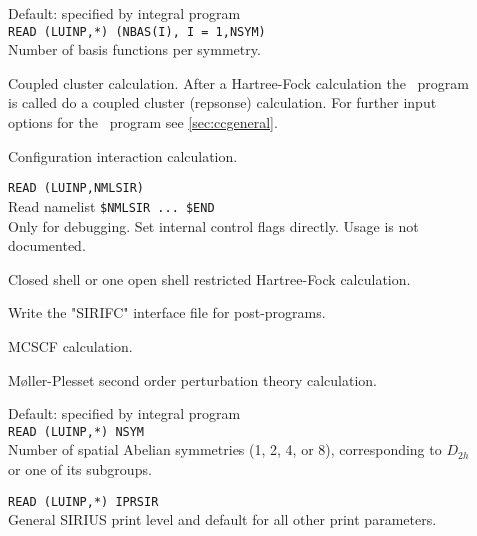 \begin{description}
\item[]
   Default: specified by integral program \\
   \verb"READ (LUINP,*) (NBAS(I), I = 1,NSYM)" \\
   Number of basis functions per symmetry.

\item[]
  Coupled cluster calculation. After a Hartree-Fock calculation
  the \cc\ program is called do a coupled cluster (repsonse) calculation.
  For further input options for the \cc\ program see \ref{sec:ccgeneral}.

\item[]
  Configuration interaction calculation.
 
\item[]
  \verb"READ (LUINP,NMLSIR)" \\
  Read namelist \verb"$NMLSIR ... $END" \\
  Only for debugging. Set internal control flags directly.
  Usage is not documented.

\item[]
  Closed shell or one open shell restricted
  Hartree-Fock calculation. 
 
\item[]
  Write the "SIRIFC" interface file for post-programs.
 
\item[]
  MCSCF calculation.
 
\item[]
  M{\o}ller-Plesset second order perturbation theory calculation. 
 
\item[]
  Default: specified by integral program \\
  \verb"READ (LUINP,*) NSYM" \\
  Number of spatial Abelian symmetries (1, 2, 4, or 8), corresponding
  to $D_{2h}$ or one of its subgroups.
 
 
\item[]
  \verb"READ (LUINP,*) IPRSIR" \\
  General SIRIUS print level and default for all other print parameters.
 

\end{description}
